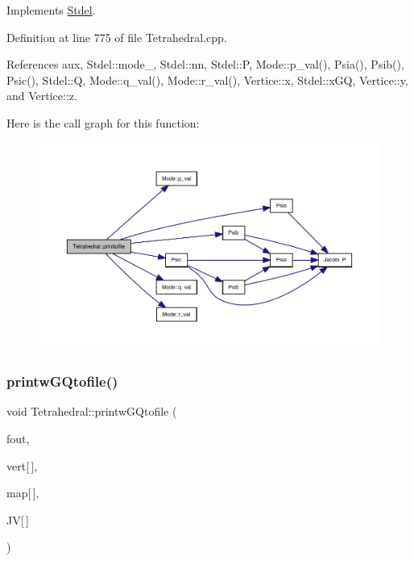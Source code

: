 Implements \hyperlink{classStdel_a6863f8aeb8e4fb01299b109b0dd3fe13}{Stdel}.



Definition at line 775 of file Tetrahedral.\+cpp.



References aux, Stdel\+::mode\+\_\+, Stdel\+::nn, Stdel\+::P, Mode\+::p\+\_\+val(), Psia(), Psib(), Psic(), Stdel\+::Q, Mode\+::q\+\_\+val(), Mode\+::r\+\_\+val(), Vertice\+::x, Stdel\+::x\+GQ, Vertice\+::y, and Vertice\+::z.

Here is the call graph for this function\+:
\nopagebreak
\begin{figure}[H]
\begin{center}
\leavevmode
\includegraphics[width=350pt]{classTetrahedral_a615fe4c0df26ac87f46640c82fbe12b6_cgraph}
\end{center}
\end{figure}
\mbox{\label{classTetrahedral_aaffdc06480015e7663d5c934a992b577}} 
\subsubsection{\texorpdfstring{printw\+G\+Qtofile()}{printwGQtofile()}}
{\footnotesize\ttfamily void Tetrahedral\+::printw\+G\+Qtofile (\begin{DoxyParamCaption}\item[{F\+I\+LE $\ast$}]{fout,  }\item[{const \hyperlink{structVertice}{Vertice}}]{vert\mbox{[}$\,$\mbox{]},  }\item[{const int}]{map\mbox{[}$\,$\mbox{]},  }\item[{const double}]{JV\mbox{[}$\,$\mbox{]} }\end{DoxyParamCaption})\hspace{0.3cm}{\ttfamily [virtual]}}



